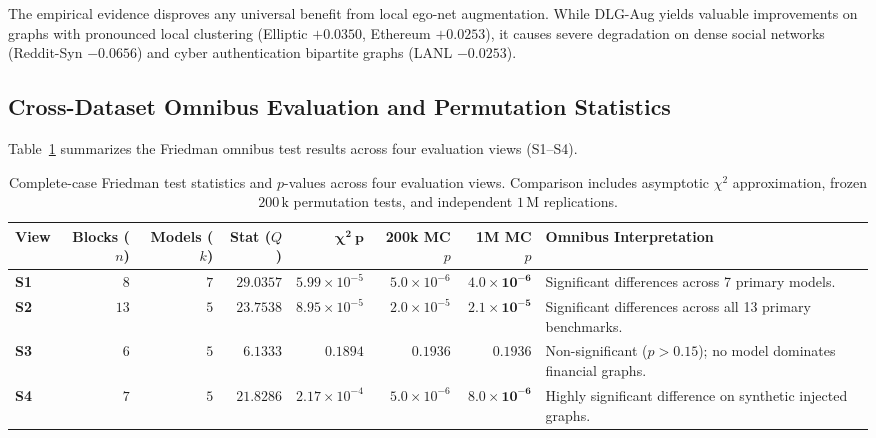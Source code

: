 \documentclass[11pt,a4paper]{article}
\begin{document}
The empirical evidence disproves any universal benefit from local ego-net augmentation. While DLG-Aug yields valuable improvements on graphs with pronounced local clustering (Elliptic $+0.0350$, Ethereum $+0.0253$), it causes severe degradation on dense social networks (Reddit-Syn $-0.0656$) and cyber authentication bipartite graphs (LANL $-0.0253$).

\subsection{Cross-Dataset Omnibus Evaluation and Permutation Statistics}
Table~\ref{tab:friedman_stats} summarizes the Friedman omnibus test results across four evaluation views (S1--S4).

\begin{table}[htbp]
\centering\footnotesize\setlength{\tabcolsep}{3.5pt}
\caption{Complete-case Friedman test statistics and $p$-values across four evaluation views. Comparison includes asymptotic $\chi^2$ approximation, frozen $200\,\mathrm{k}$ permutation tests, and independent $1\,\mathrm{M}$ replications.}
\label{tab:friedman_stats}
\begin{tabularx}{\textwidth}{lrrrrrr>{\raggedright\arraybackslash}X}\toprule
\textbf{View} & \textbf{Blocks ($n$)} & \textbf{Models ($k$)} & \textbf{Stat ($Q$)} & $\mathbf{\chi^2\ p}$ & \textbf{200k MC $p$} & \textbf{1M MC $p$} & \textbf{Omnibus Interpretation} \\\midrule
\textbf{S1} & $8$ & $7$ & $29.0357$ & $5.99 \times 10^{-5}$ & $5.0 \times 10^{-6}$ & $\mathbf{4.0 \times 10^{-6}}$ & Significant differences across 7 primary models. \\
\textbf{S2} & $13$ & $5$ & $23.7538$ & $8.95 \times 10^{-5}$ & $2.0 \times 10^{-5}$ & $\mathbf{2.1 \times 10^{-5}}$ & Significant differences across all 13 primary benchmarks. \\
\textbf{S3} & $6$ & $5$ & $6.1333$ & $0.1894$ & $0.1936$ & $\mathbf{0.1936}$ & Non-significant ($p > 0.15$); no model dominates financial graphs. \\
\textbf{S4} & $7$ & $5$ & $21.8286$ & $2.17 \times 10^{-4}$ & $5.0 \times 10^{-6}$ & $\mathbf{8.0 \times 10^{-6}}$ & Highly significant difference on synthetic injected graphs. \\\bottomrule
\end{tabularx}
\end{table}
\end{document}

